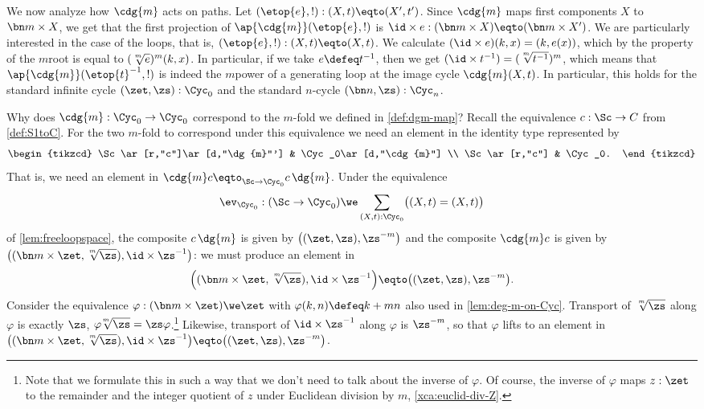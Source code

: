 We now analyze how $\cdg{m}$ acts on paths.
Let $({\etop{e}},{!}):(X,t)\eqto(X',t')$.
Since $\cdg{m}$ maps first components $X$ to $\bn m\times X$, we get that
the first projection of $\ap{\cdg{m}}({\etop{e}},{!})$ is
${\id\times e} : (\bn m\times X)\eqto(\bn m\times X')$.
We are particularly interested in the case of the loops,
that is, $({\etop{e}},{!}):(X,t)\eqto(X,t)$.
We calculate $(\id\times e)(k,x) = (k,e(x))$,
which by the property of the $m$\th root is equal to $(\sqrt[\uproot{2}m]e)^m(k,x)$.
In particular, if we take $e\defeq t^{-1}$,
then we get $(\id\times t^{-1}) = (\sqrt[\uproot{2}m]{t^{-1}})^m$, which means that
$\ap{\cdg{m}}({\etop{t}^{-1}},{!})$ is indeed the $m$\th power of a
generating loop at the image cycle $\cdg{m}(X,t)$.
In particular, this holds for the standard infinite cycle $(\zet,\zs):\Cyc_0$
and the standard $n$-cycle $(\bn n,\zs):\Cyc_n$.

Why does $\cdg{m}:\Cyc_0\to\Cyc_0$
correspond to the $m$-fold \covering we defined in \cref{def:dgm-map}?
Recall the equivalence $c:\Sc\to C$ from \cref{def:S1toC}.
For the two $m$-fold \coverings to correspond under this equivalence
we need an element in the identity type represented by
\[
  \begin{tikzcd}
    \Sc\ar[r,"c"]\ar[d,"\dg{m}"'] & \Cyc_0\ar[d,"\cdg{m}"] \\
    \Sc\ar[r,"c"] & \Cyc_0.
  \end{tikzcd}
\]
That is, we need an element in $\cdg{m}c\eqto_{\Sc\to\Cyc_0}c\,\dg{m}$.
Under the equivalence
\[
  \ev_{\Cyc_0}:(\Sc\to\Cyc_0)\we \sum_{(X,t):\Cyc_0}\bigl((X,t)=(X,t)\bigr)
\]
of \cref{lem:freeloopspace},
the composite $c\,\dg{m}$ is given by $\bigl((\zet,\zs),\zs^{-m}\bigr)$
and the composite $\cdg{m}c$ is given by
$\bigl((\bn m\times\zet,\sqrt[\uproot{2}m]{\zs}),\id\times\zs^{-1}\bigr)$:
we must produce an element in
\[
  \Bigl((\bn m\times\zet,\sqrt[\uproot{2}m]{\zs}),\id\times\zs^{-1}\Bigr)
  \eqto \bigl((\zet,\zs),\zs^{-m}\bigr).
\]
Consider the equivalence  $\varphi: (\bn m\times \zet)\we\zet$ with $\varphi(k,n)\defeq k+mn$
also used in \cref{lem:deg-m-on-Cyc}.
Transport of $\sqrt[\uproot{2}m]\zs$ along $\varphi$ is exactly $\zs$,
\ie $\varphi\!\sqrt[\uproot{2}m]\zs=\zs\varphi$.\footnote{%
Note that we formulate this in such a way that we don't need to talk about the inverse of $\varphi$.
Of course, the inverse of $\varphi$ maps $z:\zet$ to the remainder and 
the integer quotient of $z$ under Euclidean division by $m$, 
\cref{xca:euclid-div-Z}.}
Likewise, transport of $\id\times\zs^{-1}$ along $\varphi$ is $\zs^{-m}$,
so that $\varphi$ lifts to an element in
$\bigl((\bn m\times\zet,\sqrt[\uproot{2}m]{\zs}), \id\times\zs^{-1}\bigr)
\eqto \bigl((\zet,\zs),\zs^{-m}\bigr)$.

